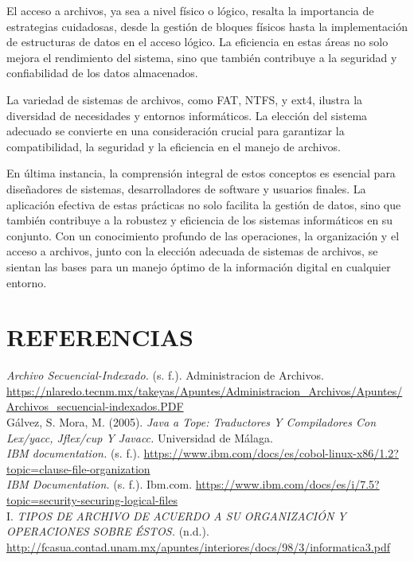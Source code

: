 \documentclass[11pt, twocolumn]{article}
\begin{document}
  El acceso a archivos, ya sea a nivel físico o lógico, resalta la importancia de estrategias cuidadosas, desde la gestión de bloques físicos hasta la implementación de estructuras de datos en el acceso lógico. La eficiencia en estas áreas no solo mejora el rendimiento del sistema, sino que también contribuye a la seguridad y confiabilidad de los datos almacenados.

  La variedad de sistemas de archivos, como FAT, NTFS, y ext4, ilustra la diversidad de necesidades y entornos informáticos. La elección del sistema adecuado se convierte en una consideración crucial para garantizar la compatibilidad, la seguridad y la eficiencia en el manejo de archivos.

  En última instancia, la comprensión integral de estos conceptos es esencial para diseñadores de sistemas, desarrolladores de software y usuarios finales. La aplicación efectiva de estas prácticas no solo facilita la gestión de datos, sino que también contribuye a la robustez y eficiencia de los sistemas informáticos en su conjunto. Con un conocimiento profundo de las operaciones, la organización y el acceso a archivos, junto con la elección adecuada de sistemas de archivos, se sientan las bases para un manejo óptimo de la información digital en cualquier entorno.

  \section{REFERENCIAS}
  \setlength{\parindent}{0.0cm}
  \small
  \textit{Archivo Secuencial-Indexado.} (s. f.). Administracion de Archivos. \url{https://nlaredo.tecnm.mx/takeyas/Apuntes/Administracion_Archivos/Apuntes/Archivos_secuencial-indexados.PDF} \\

  Gálvez, S. Mora, M. (2005). \textit{Java a Tope: Traductores Y Compiladores Con Lex/yacc, Jflex/cup Y Javacc.} Universidad de Málaga. \\

  \textit{IBM documentation.} (s. f.). \url{https://www.ibm.com/docs/es/cobol-linux-x86/1.2?topic=clause-file-organization} \\

  \textit{IBM Documentation.} (s. f.). Ibm.com. \url{https://www.ibm.com/docs/es/i/7.5?topic=security-securing-logical-files} \\

  I. \textit{TIPOS DE ARCHIVO DE ACUERDO A SU ORGANIZACIÓN Y OPERACIONES SOBRE ÉSTOS.} (n.d.). \url{http://fcasua.contad.unam.mx/apuntes/interiores/docs/98/3/informatica3.pdf} \\
\end{document}
